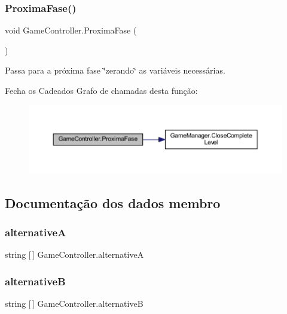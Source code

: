 \subsubsection{ProximaFase()}
{\footnotesize\ttfamily void Game\+Controller.\+Proxima\+Fase (\begin{DoxyParamCaption}{ }\end{DoxyParamCaption})}



Passa para a próxima fase \char`\"{}zerando\char`\"{} as variáveis necessárias. 

Fecha os Cadeados Grafo de chamadas desta função\+:
\nopagebreak
\begin{figure}[H]
\begin{center}
\leavevmode
\includegraphics[width=350pt]{class_game_controller_acd3c2bfd80eed314ce9b253d9fa3ca71_cgraph}
\end{center}
\end{figure}


\subsection{Documentação dos dados membro}
\mbox{\label{class_game_controller_aba1451c8f8ec8d59962cb9f7601dfcba}} 
\subsubsection{alternativeA}
{\footnotesize\ttfamily string [$\,$] Game\+Controller.\+alternativeA}

\mbox{\label{class_game_controller_a1d948c8579ffc832ada3c8f350c1361c}} 
\subsubsection{alternativeB}
{\footnotesize\ttfamily string [$\,$] Game\+Controller.\+alternativeB}

